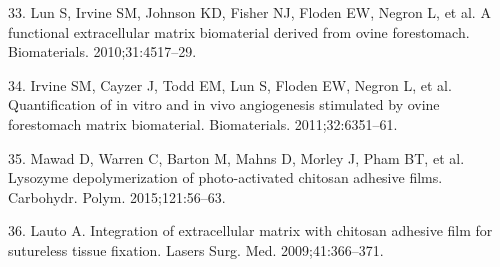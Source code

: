 33. Lun S, Irvine SM, Johnson KD, Fisher NJ, Floden EW, Negron L, et al. A functional extracellular matrix biomaterial derived from ovine forestomach. Biomaterials. 2010;31:4517–29. 

34. Irvine SM, Cayzer J, Todd EM, Lun S, Floden EW, Negron L, et al. Quantification of in vitro and in vivo angiogenesis stimulated by ovine forestomach matrix biomaterial. Biomaterials. 2011;32:6351–61. 

35. Mawad D, Warren C, Barton M, Mahns D, Morley J, Pham BT, et al. Lysozyme depolymerization of photo-activated chitosan adhesive films. Carbohydr. Polym. 2015;121:56–63. 

36.	Lauto A. Integration of extracellular matrix with chitosan adhesive film for sutureless tissue fixation. Lasers Surg. Med. 2009;41:366–371. 
